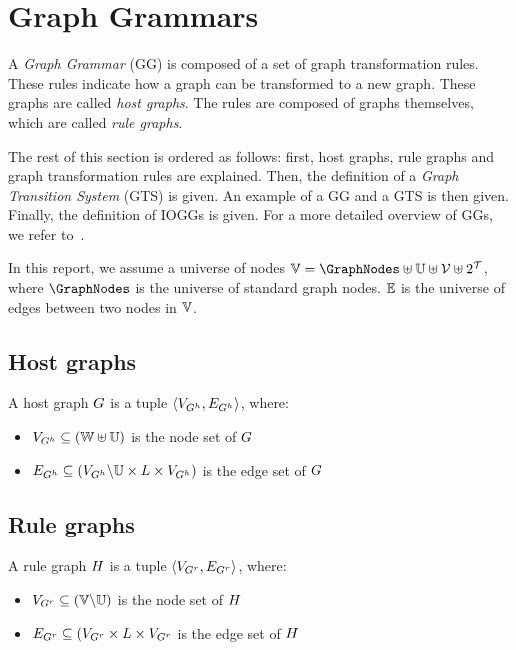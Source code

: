 \section{Graph Grammars}\label{sec:graph}
A \textit{Graph Grammar} (GG) is composed of a set of graph transformation rules. These rules indicate how a graph can be transformed to a new graph. These graphs are called \textit{host graphs}. The rules are composed of graphs themselves, which are called \textit{rule graphs}.

The rest of this section is ordered as follows: first, host graphs, rule graphs and graph transformation rules are explained. Then, the definition of a \textit{Graph Transition System} (GTS) is given. An example of a GG and a GTS is then given. Finally, the definition of IOGGs is given. For a more detailed overview of GGs, we refer to~\cite{Rensink:graph_grammars, Heckel2006187, Andries1999}.

In this report, we assume a universe of nodes $\Nodes = \GraphNodes \uplus \mathbb{U} \uplus \Variables \uplus 2^\Terms$, where $\GraphNodes$ is the universe of standard graph nodes. $\mathbb{E}$ is the universe of edges between two nodes in $\mathbb{V}$.

\subsection{Host graphs}
A host graph $G$ is a tuple $\langle V_{G^h}, E_{G^h}\rangle$, where:
\begin{itemize}
  \item $V_{G^h} \subseteq (\mathbb{W} \uplus \mathbb{U})$ is the node set of $G$
  \item $E_{G^h} \subseteq (V_{G^h}\backslash\mathbb{U} \times L \times V_{G^h})$ is the edge set of $G$
\end{itemize}

\subsection{Rule graphs}
A rule graph $H$ is a tuple $\langle V_{G^r}, E_{G^r} \rangle$, where:
\begin{itemize}
  \item $V_{G^r} \subseteq (\mathbb{V} \backslash \mathbb{U})$ is the node set of $H$
  \item $E_{G^r} \subseteq (V_{G^r} \times L \times V_{G^r}$ is the edge set of $H$
\end{itemize}

